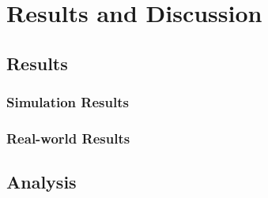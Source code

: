 \chapter{Results and Discussion}

\section{Results}

\subsection{Simulation Results}

\subsection{Real-world Results}

\section{Analysis}